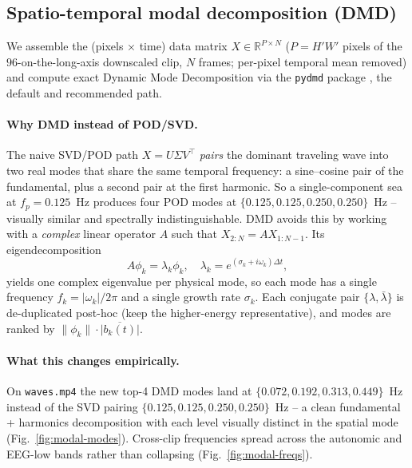 \documentclass[11pt,a4paper]{article}
\newcommand{\code}[1]{\texttt{\small #1}}
\begin{document}
\subsection{Spatio-temporal modal decomposition (DMD)}\label{sec:modal-section}

We assemble the (pixels $\times$ time) data matrix
$X \in \mathbb{R}^{P \times N}$ ($P = H'W'$ pixels of the
$96$-on-the-long-axis downscaled clip, $N$ frames; per-pixel temporal
mean removed) and compute exact Dynamic Mode Decomposition
\citep{schmid2010,kutz2016} via the \code{pydmd} package
\citep{demo2018pydmd}, the default and recommended path.

\paragraph{Why DMD instead of POD/SVD.} The naive SVD/POD path
$X = U \Sigma V^\top$ \emph{pairs} the dominant traveling wave into two
real modes that share the same temporal frequency: a sine--cosine pair
of the fundamental, plus a second pair at the first harmonic. So a
single-component sea at $f_p = 0.125$~Hz produces four POD modes at
$\{0.125, 0.125, 0.250, 0.250\}$~Hz -- visually similar and
spectrally indistinguishable. DMD avoids this by working with a
\emph{complex} linear operator $A$ such that
$X_{2:N} = A X_{1:N-1}$. Its eigendecomposition
\begin{equation}
  A \phi_k = \lambda_k \phi_k,\quad
  \lambda_k = e^{(\sigma_k + i\omega_k)\Delta t},
\end{equation}
yields one complex eigenvalue per physical mode, so each mode has a
single frequency $f_k = |\omega_k|/2\pi$ and a single growth rate
$\sigma_k$. Each conjugate pair $\{\lambda, \bar\lambda\}$ is
de-duplicated post-hoc (keep the higher-energy representative), and
modes are ranked by $\|\phi_k\| \cdot \overline{|b_k(t)|}$.

\paragraph{What this changes empirically.} On \texttt{waves.mp4} the new
top-4 DMD modes land at $\{0.072, 0.192, 0.313, 0.449\}$~Hz instead of
the SVD pairing $\{0.125, 0.125, 0.250, 0.250\}$~Hz -- a clean
fundamental + harmonics decomposition with each level visually distinct
in the spatial mode (Fig.~\ref{fig:modal-modes}). Cross-clip frequencies
spread across the autonomic and EEG-low bands rather than collapsing
(Fig.~\ref{fig:modal-freqs}).
\end{document}
